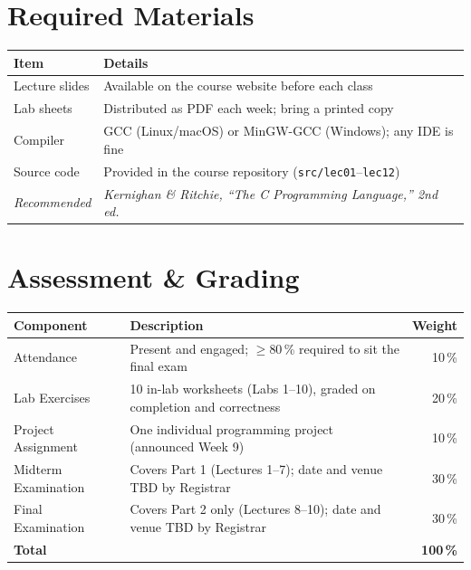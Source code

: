 \documentclass[11pt,a4paper]{article}
\begin{document}
\section{Required Materials}

\begin{tabularx}{\textwidth}{@{}lX@{}}
  \toprule
  \textbf{Item}       & \textbf{Details} \\
  \midrule
  Lecture slides      & Available on the course website before each class \\
  Lab sheets          & Distributed as PDF each week; bring a printed copy \\
  Compiler            & GCC (Linux/macOS) or MinGW-GCC (Windows); any IDE is fine \\
  Source code         & Provided in the course repository (\texttt{src/lec01}--\texttt{lec12}) \\
  \midrule
  \textit{Recommended} & \textit{Kernighan \& Ritchie, ``The C Programming Language,'' 2nd ed.} \\
  \bottomrule
\end{tabularx}

\section{Assessment \& Grading}

\begin{tabularx}{\textwidth}{@{}lXr@{}}
  \toprule
  \textbf{Component} & \textbf{Description} & \textbf{Weight} \\
  \midrule
  Attendance          & Present and engaged; $\geq$80\,\% required to sit the final exam  & 10\,\% \\[2pt]
  Lab Exercises       & 10 in-lab worksheets (Labs 1--10), graded on completion and correctness & 20\,\% \\[2pt]
  Project Assignment  & One individual programming project (announced Week 9) & 10\,\% \\[2pt]
  Midterm Examination & Covers Part 1 (Lectures 1--7); date and venue TBD by Registrar & 30\,\% \\[2pt]
  Final Examination   & Covers Part 2 only (Lectures 8--10); date and venue TBD by Registrar & 30\,\% \\
  \midrule
  \textbf{Total}      & & \textbf{100\,\%} \\
  \bottomrule
\end{tabularx}
\end{document}
